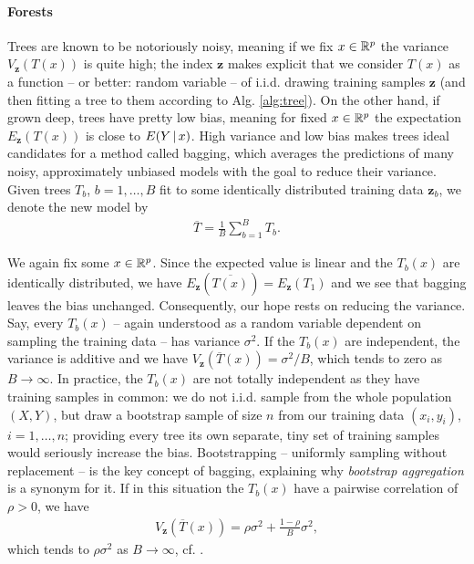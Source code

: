 \paragraph{Forests}
Trees are known to be notoriously noisy, meaning if we fix $x \in \mathbb{R}^p$ the variance 
$V_\mathbf{z}(T(x))$ is quite high; the index $\mathbf{z}$ makes explicit that we consider $T(x)$ as 
a function -- or better: random variable -- of i.i.d. drawing training samples $\mathbf{z}$ (and 
then fitting a tree to them according to Alg. \ref{alg:tree}). On the other hand, if grown deep,
trees have pretty low bias, meaning for fixed $x \in \mathbb{R}^p$ the expectation $E_\mathbf{z}(T(x))$ 
is close to $E(Y \,|\, x)$. High variance and low bias makes trees 
ideal candidates for a method called bagging, which averages the predictions of many noisy, 
approximately unbiased models with the goal to reduce their variance. Given trees $T_b$, $b = 1, 
\ldots, B$ fit to some identically distributed training data $\mathbf{z}_b$, we denote the new model by 
\begin{align}
    \overline{T} = \frac{1}{B} \sum_{b=1}^B T_b.
\end{align}

We again fix some $x \in \mathbb{R}^p$. Since the expected value is linear and the $T_b(x)$ are identically 
distributed, we have $E_\mathbf{z}(\overline{T(x)}) = E_\mathbf{z}(T_1)$ and we see that bagging 
leaves the bias unchanged. Consequently, our hope rests on reducing the variance. Say, every 
$T_b(x)$ -- again understood as a random variable dependent on sampling the training data -- has 
variance $\sigma^2$. If the $T_b(x)$ are independent, the variance is additive and we have 
$V_\mathbf{z}(\overline{T}(x)) = \sigma^2/B$, which tends to zero as $B \to \infty$. In practice, 
the $T_b(x)$ are not totally independent as they have training samples in common: we do not i.i.d. 
sample from the whole population $(X, Y)$, but draw a bootstrap sample of size $n$ from our training 
data $(x_i, y_i)$, $i = 1, \ldots, n$; providing every 
tree its own separate, tiny set of training samples would seriously increase the bias. Bootstrapping 
-- uniformly sampling without replacement -- is the key concept of bagging, explaining why 
\textit{bootstrap aggregation} is a synonym for it. If in this 
situation the $T_b(x)$ have a pairwise correlation of $\rho > 0$, we have 
\begin{align}
    V_\mathbf{z}\left(\overline{T}(x)\right) = \rho \sigma^2 + \frac{1-\rho}{B} \sigma^2,
\end{align}
which tends to $\rho \sigma^2$ as $B \to \infty$, cf. \cite[eq. (15.1)]{elem-stat-learn01}.

